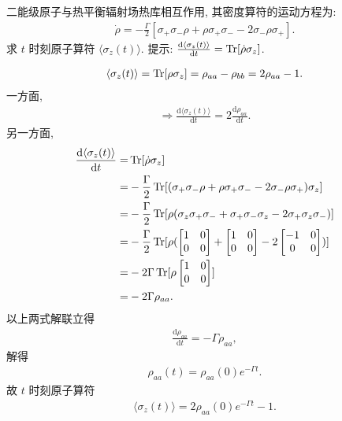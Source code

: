 \documentclass{assignment}
\begin{document}
\begin{prob}
    二能级原子与热平衡辐射场热库相互作用, 其密度算符的运动方程为:
    \begin{align}
        \dot{\rho}=-\frac{\Gamma}{2}[\sigma_+\sigma_-\rho+\rho\sigma_+\sigma_--2\sigma_-\rho\sigma_+].
    \end{align}
    求 $t$ 时刻原子算符 $\langle\sigma_z(t)\rangle$. 提示: $\frac{\mathrm{d}\langle\sigma_z(t)\rangle}{\mathrm{d}t}=\operatorname{Tr}[\dot{\rho}\sigma_z]$.
\end{prob}
\begin{sol}
    \begin{align}
        \langle\sigma_z(t)\rangle=\operatorname{Tr}[\rho\sigma_z]=\rho_{aa}-\rho_{bb}=2\rho_{aa}-1.
    \end{align}
    一方面,
    \begin{align}
        \Longrightarrow\frac{\mathrm{d}\langle\sigma_z(t)\rangle}{\mathrm{d}t}=2\frac{\mathrm{d}\rho_{aa}}{\mathrm{d}t}.
    \end{align}
    另一方面,
    \begin{align}
        \notag\frac{\mathrm{d}\langle\sigma_z(t)\rangle}{\mathrm{d}t}=&\operatorname{Tr}[\dot{\rho}\sigma_z]\\
        \notag=&-\frac{\Gamma}{2}\operatorname{Tr}[(\sigma_+\sigma_-\rho+\rho\sigma_+\sigma_--2\sigma_-\rho\sigma_+)\sigma_z]\\
        \notag=&-\frac{\Gamma}{2}\operatorname{Tr}[\rho(\sigma_z\sigma_+\sigma_-+\sigma_+\sigma_-\sigma_z-2\sigma_+\sigma_z\sigma_-)]\\
        \notag=&-\frac{\Gamma}{2}\operatorname{Tr}[\rho(\begin{bmatrix}
            1&0\\
            0&0
        \end{bmatrix}+\begin{bmatrix}
            1&0\\
            0&0
        \end{bmatrix}-2\begin{bmatrix}
            -1&0\\
            0&0
        \end{bmatrix})]\\
        \notag=&-2\Gamma\operatorname{Tr}[\rho\begin{bmatrix}
            1&0\\
            0&0
        \end{bmatrix}]\\
        =&-2\Gamma\rho_{aa}.
    \end{align}
    以上两式解联立得
    \begin{align}
        \frac{\mathrm{d}\rho_{aa}}{\mathrm{d}t}=-\Gamma\rho_{aa},
    \end{align}
    解得
    \begin{align}
        \rho_{aa}(t)=\rho_{aa}(0)e^{-\Gamma t}.
    \end{align}
    故 $t$ 时刻原子算符
    \begin{align}
        \langle\sigma_z(t)\rangle=2\rho_{aa}(0)e^{-\Gamma t}-1.
    \end{align}
\end{sol}
\end{document}
